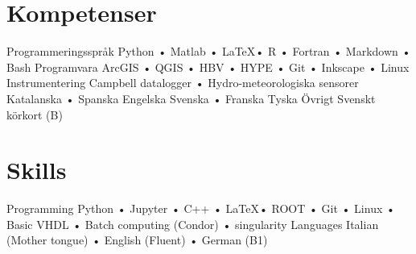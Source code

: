 \ifswedish
  \section{Kompetenser}
    \skill
      {Programmeringsspråk}
      {Python • Matlab • \LaTeX • R • Fortran • Markdown • Bash}
    \skill
      {Programvara}
      {ArcGIS • QGIS • HBV • HYPE • Git • Inkscape • Linux}
    \skill
      {Instrumentering}
      {Campbell datalogger • Hydro-meteorologiska sensorer}
    \languages
      {Katalanska • Spanska}
      {Engelska}
      {Svenska • Franska}
      {Tyska}
    \skill
      {Övrigt}
      {Svenskt körkort (B)}
\else
  \section{Skills}
    \skill
      {Programming}
      {Python • Jupyter • C++ • \LaTeX • ROOT • Git • Linux • Basic VHDL • Batch computing (Condor) • singularity }
    \skill
      {Languages}
      {Italian (Mother tongue) • English (Fluent) • German (B1)}
   \fi
